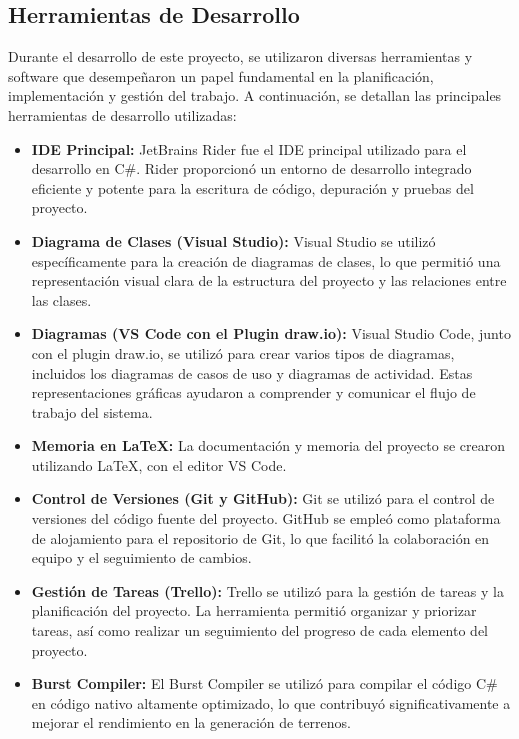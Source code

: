\subsection{Herramientas de Desarrollo}

Durante el desarrollo de este proyecto, se utilizaron diversas herramientas y software que desempeñaron un papel fundamental en la planificación, implementación y gestión del trabajo. A continuación, se detallan las principales herramientas de desarrollo utilizadas:

\begin{itemize}
    \item \textbf{IDE Principal:} JetBrains Rider fue el IDE principal utilizado para el desarrollo en C\#. Rider proporcionó un entorno de desarrollo integrado eficiente y potente para la escritura de código, depuración y pruebas del proyecto.
    
    \item \textbf{Diagrama de Clases (Visual Studio):} Visual Studio se utilizó específicamente para la creación de diagramas de clases, lo que permitió una representación visual clara de la estructura del proyecto y las relaciones entre las clases.
    
    \item \textbf{Diagramas (VS Code con el Plugin draw.io):} Visual Studio Code, junto con el plugin draw.io, se utilizó para crear varios tipos de diagramas, incluidos los diagramas de casos de uso y diagramas de actividad. Estas representaciones gráficas ayudaron a comprender y comunicar el flujo de trabajo del sistema.
    
    \item \textbf{Memoria en LaTeX:} La documentación y memoria del proyecto se crearon utilizando LaTeX, con el editor VS Code.
    
    \item \textbf{Control de Versiones (Git y GitHub):} Git se utilizó para el control de versiones del código fuente del proyecto. GitHub se empleó como plataforma de alojamiento para el repositorio de Git, lo que facilitó la colaboración en equipo y el seguimiento de cambios.
    
    \item \textbf{Gestión de Tareas (Trello):} Trello se utilizó para la gestión de tareas y la planificación del proyecto. La herramienta permitió organizar y priorizar tareas, así como realizar un seguimiento del progreso de cada elemento del proyecto.
    
    \item \textbf{Burst Compiler:} El Burst Compiler se utilizó para compilar el código C\# en código nativo altamente optimizado, lo que contribuyó significativamente a mejorar el rendimiento en la generación de terrenos.
\end{itemize}

